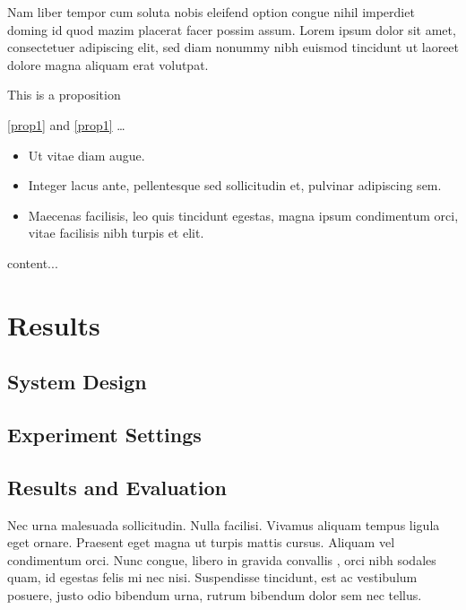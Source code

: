\documentclass[a4paper,UKenglish,cleveref, autoref, thm-restate]{lipics-v2021}
\begin{document}
\begin{corollary}
\label{lemma:curabitur}
Nam liber tempor cum soluta nobis eleifend option congue nihil imperdiet doming id quod mazim placerat facer possim assum. Lorem ipsum dolor sit amet, consectetuer adipiscing elit, sed diam nonummy nibh euismod tincidunt ut laoreet dolore magna aliquam erat volutpat.
\end{corollary}

\begin{proposition}\label{prop1}
This is a proposition
\end{proposition}

\autoref{prop1} and \cref{prop1} \ldots



\begin{itemize}
\item Ut vitae diam augue. 
\item Integer lacus ante, pellentesque sed sollicitudin et, pulvinar adipiscing sem. 
\item Maecenas facilisis, leo quis tincidunt egestas, magna ipsum condimentum orci, vitae facilisis nibh turpis et elit. 
\end{itemize}

\begin{remark}
content...
\end{remark}

\section{Results}
\subsection{System Design}
\subsection{Experiment Settings}
\subsection{Results and Evaluation}

Nec urna malesuada sollicitudin. Nulla facilisi. Vivamus aliquam tempus ligula eget ornare. Praesent eget magna ut turpis mattis cursus. Aliquam vel condimentum orci. Nunc congue, libero in gravida convallis \cite{DBLP:conf/focs/HopcroftPV75}, orci nibh sodales quam, id egestas felis mi nec nisi. Suspendisse tincidunt, est ac vestibulum posuere, justo odio bibendum urna, rutrum bibendum dolor sem nec tellus. 
\end{document}
